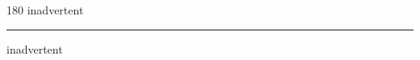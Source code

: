 
\begin{frame}
\begin{center}
\begin{turn}{180}
{\fontsize{2.5cm}{1em}\selectfont inadvertent}
\end{turn}
\vspace{1em}\par  
\hrule
\vspace{1em}\par  
{\fontsize{2.5cm}{1em}\selectfont inadvertent}
\end{center}
\end{frame}
